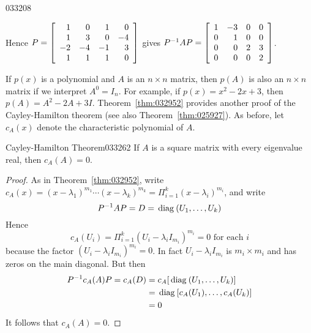 \begin{example}{}{033208}
\begin{solution}
Hence $P = \left[ \begin{array}{rrrr}
1 & 0 & 1 & 0 \\
1 & 3 & 0 & -4 \\
-2 & -4 & -1 & 3 \\
1 & 1 & 1 & 0
\end{array} \right]$
 gives $P^{-1}AP = \left[ \begin{array}{rrrr}
 1 & -3 & 0 & 0 \\
 0 & 1 & 0 & 0 \\
 0 & 0 & 2 & 3 \\
 0 & 0 & 0 & 2
 \end{array} \right]$.
\end{solution}
\end{example}

If $p(x)$ is a polynomial and $A$ is an $n \times n$ matrix, then $p(A)$ is also an $n \times n$ matrix if we interpret $A^{0} = I_{n}$. For example, if $p(x) = x^{2} - 2x + 3$, then $p(A) = A^{2} - 2A + 3I$. Theorem~\ref{thm:032952} provides another proof of the Cayley-Hamilton theorem (see also Theorem~\ref{thm:025927}). As before, let $c_{A}(x)$ denote the characteristic polynomial of $A$.

\begin{theorem}{Cayley-Hamilton Theorem}{033262}
If $A$ is a square matrix with every eigenvalue real, then $c_{A}(A) = 0$.
\end{theorem}

\begin{proof}
As in Theorem~\ref{thm:032952}, write $c_A(x) = (x - \lambda_1)^{m_1} \cdots (x - \lambda_k)^{m_k} = \Pi_{i=1}^{k}(x - \lambda_i)^{m_i}$, and write 
\begin{equation*}
P^{-1}AP = D = \thinspace\operatorname{diag\medspace}(U_{1}, \dots, U_{k})
\end{equation*}
 Hence
\begin{equation*}
c_A(U_i) = \Pi_{i=1}^{k}(U_i - \lambda_{i}I_{m_i})^{m_i} = 0 \mbox{ for each } i
\end{equation*}
because the factor $(U_i - \lambda_{i}I_{m_i})^{m_i} = 0$. In fact $U_i - \lambda_{i}I_{m_i}$ is $m_{i} \times m_{i}$ and has zeros on the main diagonal. But then
\begin{align*}
P^{-1}c_{A}(A)P = c_{A}(D) &= c_A[\thinspace\operatorname{diag\medspace}(U_1, \dots, U_k)] \\
&= \thinspace\operatorname{diag\medspace}[c_A(U_1), \dots, c_A(U_k)] \\
&= 0
\end{align*}
It follows that $c_{A}(A) = 0$.
\end{proof}

